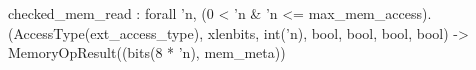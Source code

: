 checked_mem_read : forall 'n, (0 < 'n & 'n <= max_mem_access).
  (AccessType(ext_access_type), xlenbits, int('n), bool, bool, bool, bool) -> MemoryOpResult((bits(8 * 'n), mem_meta))